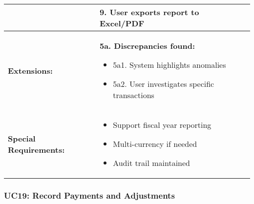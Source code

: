\documentclass[12pt]{article}
\begin{document}
\begin{tabular}{|p{3cm}|p{11cm}|}
& 9. User exports report to Excel/PDF \\
\hline
\textbf{Extensions:} & 
\textbf{5a. Discrepancies found:}
\begin{itemize}
    \item 5a1. System highlights anomalies
    \item 5a2. User investigates specific transactions
\end{itemize} \\
\hline
\textbf{Special Requirements:} & 
\begin{itemize}
    \item Support fiscal year reporting
    \item Multi-currency if needed
    \item Audit trail maintained
\end{itemize} \\
\hline
\end{tabular}


\subsubsection{UC19: Record Payments and Adjustments}
\end{document}
